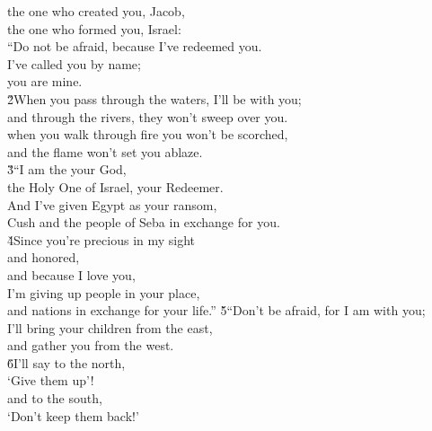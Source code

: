 \begin{poetry}
\poemll    the one who created you, Jacob, \\
\poemlll       the one who formed you, Israel: \\
\poeml ``Do not be afraid, because I've redeemed you. \\
\poemll    I've called you by name; \\
\poemlll       you are mine. \\
\poeml \v{2}When you pass through the waters, I'll be with you; \\
\poemll    and through the rivers, they won't sweep over you. \\
\poeml when you walk through fire you won't be scorched, \\
\poemll    and the flame won't set you ablaze. \\
\poeml \v{3}``I am the  your God, \\
\poemll    the Holy One of Israel, your Redeemer. \\
\poeml And I've given Egypt as your ransom, \\
\poemll    Cush and the people of Seba in exchange for you. \\
\poeml \v{4}Since you're precious in my sight \\
\poemll    and honored, \\
\poeml and because I love you, \\
\poemll    I'm giving up people in your place, \\
\poemll    and nations in exchange for your life.''
\poeml \v{5}``Don't be afraid, for I am with you; \\
\poemll    I'll bring your children from the east, \\
\poemlll       and gather you from the west. \\
\poeml \v{6}I'll say to the north, \\
\poemll    `Give them up'! \\
\poeml and to the south, \\
\poemll    `Don't keep them back!' \\

\end{poetry}
